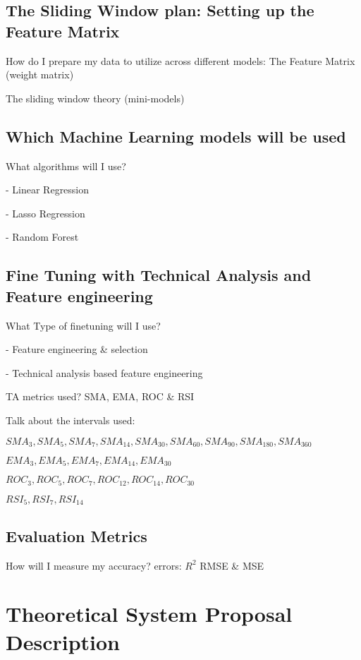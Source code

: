 \documentclass[12pt]{report} %
\begin{document}
\section{The Sliding Window plan: Setting up the Feature Matrix}

How do I prepare my data to utilize across different models: The Feature Matrix (weight matrix)

The sliding window theory (mini-models)

\section{Which Machine Learning models will be used}
What algorithms will I use?

- Linear Regression

- Lasso Regression

- Random Forest

\section{Fine Tuning with Technical Analysis and Feature engineering}
What Type of finetuning will I use?

- Feature engineering \& selection

- Technical analysis based feature engineering
    
    TA metrics used? SMA, EMA, ROC \& RSI

    Talk about the intervals used:
    
    $ SMA_3,SMA_5,SMA_7,SMA_{14},SMA_{30},SMA_{60},SMA_{90},SMA_{180},SMA_{360} $
    
    $ EMA_3,EMA_5,EMA_7,EMA_{14},EMA_{30} $
    
    $ ROC_3,ROC_5,ROC_7,ROC_{12},ROC_{14},ROC_{30} $
    
    $ RSI_5,RSI_7,RSI_{14} $


\section{Evaluation Metrics}
How will I measure my accuracy? errors:
$ R^2 $
RMSE \& MSE



\chapter{Theoretical System Proposal Description}
\end{document}
